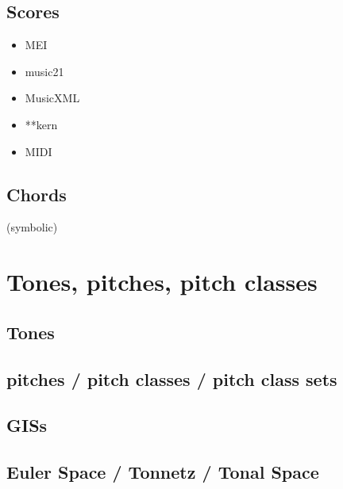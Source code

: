 \documentclass[letterpaper,10pt,english]{sphinxmanual}
\begin{document}
\subsection{Scores}
\label{\detokenize{1_fundamentals:scores}}\begin{itemize}
\item {} 
MEI

\item {} 
music21

\item {} 
MusicXML

\item {} 
**kern

\item {} 
MIDI

\end{itemize}


\subsection{Chords}
\label{\detokenize{1_fundamentals:chords}}
(symbolic)


\section{Tones, pitches, pitch classes}
\label{\detokenize{1_fundamentals:tones-pitches-pitch-classes}}

\subsection{Tones}
\label{\detokenize{1_fundamentals:tones}}

\subsection{pitches / pitch classes / pitch class sets}
\label{\detokenize{1_fundamentals:pitches-pitch-classes-pitch-class-sets}}

\subsection{GISs}
\label{\detokenize{1_fundamentals:giss}}

\subsection{Euler Space / Tonnetz / Tonal Space}
\label{\detokenize{1_fundamentals:euler-space-tonnetz-tonal-space}}
\end{document}

